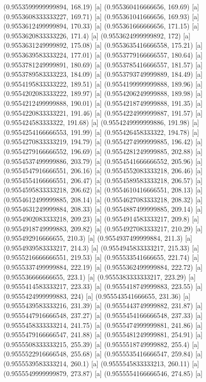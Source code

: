 {{{(0.9553599999999894, 168.19) [a] 
(0.955360416666656, 169.69) [a] 
(0.9553608333333227, 169.71) [a] 
(0.955361041666656, 169.93) [a] 
(0.9553612499999894, 170.33) [a] 
(0.955361666666656, 171.15) [a] 
(0.9553620833333226, 171.4) [a] 
(0.9553624999999892, 172) [a] 
(0.9553631249999892, 175.08) [a] 
(0.9553635416666558, 175.21) [a] 
(0.9553639583333224, 177.01) [a] 
(0.9553779166666557, 180.64) [a] 
(0.9553781249999891, 180.69) [a] 
(0.9553785416666557, 181.57) [a] 
(0.9553789583333223, 184.09) [a] 
(0.9553793749999889, 184.49) [a] 
(0.9554195833333222, 189.51) [a] 
(0.9554199999999888, 189.96) [a] 
(0.9554202083333222, 189.97) [a] 
(0.9554206249999888, 189.98) [a] 
(0.9554212499999888, 190.01) [a] 
(0.9554218749999888, 191.35) [a] 
(0.9554220833333221, 191.46) [a] 
(0.9554224999999887, 191.57) [a] 
(0.955424583333322, 191.68) [a] 
(0.9554249999999886, 191.98) [a] 
(0.9554254166666553, 191.99) [a] 
(0.955426458333322, 194.78) [a] 
(0.9554270833333219, 194.79) [a] 
(0.9554274999999885, 196.42) [a] 
(0.9554279166666552, 196.69) [a] 
(0.9554281249999885, 202.88) [a] 
(0.9554537499999886, 203.79) [a] 
(0.9554541666666552, 205.96) [a] 
(0.9554547916666551, 206.16) [a] 
(0.9554552083333218, 206.46) [a] 
(0.9554554166666551, 206.47) [a] 
(0.9554589583333218, 206.57) [a] 
(0.9554595833333218, 206.62) [a] 
(0.9554610416666551, 208.13) [a] 
(0.9554612499999885, 208.14) [a] 
(0.9554627083333218, 208.32) [a] 
(0.9554631249999884, 208.33) [a] 
(0.9554887499999885, 209.14) [a] 
(0.9554902083333218, 209.23) [a] 
(0.9554914583333217, 209.8) [a] 
(0.9554918749999883, 209.82) [a] 
(0.9554927083333217, 210.29) [a] 
(0.955492916666655, 210.3) [a] 
(0.9554937499999884, 211.3) [a] 
(0.9554939583333217, 214.3) [a] 
(0.9554945833333217, 215.33) [a] 
(0.9555216666666551, 219.53) [a] 
(0.955533541666655, 221.74) [a] 
(0.9555337499999884, 222.19) [a] 
(0.9555362499999884, 222.72) [a] 
(0.955536666666655, 223.1) [a] 
(0.9555383333333217, 223.29) [a] 
(0.9555414583333217, 223.33) [a] 
(0.9555418749999883, 223.55) [a] 
(0.9555424999999883, 224) [a] 
(0.955543541666655, 231.36) [a] 
(0.9555439583333216, 231.39) [a] 
(0.9555443749999882, 231.87) [a] 
(0.9555447916666548, 237.27) [a] 
(0.9555454166666548, 237.33) [a] 
(0.9555458333333214, 241.75) [a] 
(0.9555474999999881, 241.86) [a] 
(0.9555479166666547, 241.88) [a] 
(0.9555481249999881, 254.91) [a] 
(0.9555508333333215, 255.39) [a] 
(0.9555518749999882, 255.4) [a] 
(0.9555522916666548, 255.68) [a] 
(0.9555535416666547, 259.84) [a] 
(0.9555539583333214, 260.1) [a] 
(0.9555545833333213, 260.11) [a] 
(0.9555549999999879, 273.87) [a] 
(0.9555554166666546, 274.85) [a] 
}}}
